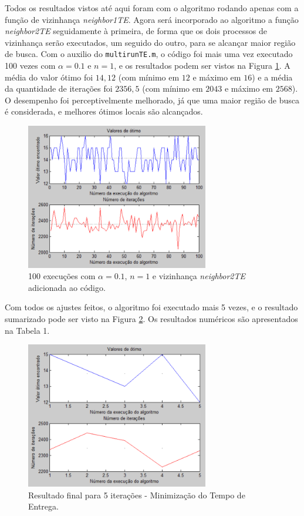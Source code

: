 \documentclass[conference]{IEEEtran}
\begin{document}
Todos os resultados vistos até aqui foram com o algoritmo rodando apenas com a função de vizinhança \textit{neighbor1TE}. Agora será incorporado ao algoritmo a função \textit{neighbor2TE} seguidamente à primeira, de forma que os dois processos de vizinhança serão executados, um seguido do outro, para se alcançar maior região de busca. Com o auxilio do \texttt{multirunTE.m}, o código foi mais uma vez executado 100 vezes com $\alpha = 0.1$ e $n = 1$, e os resultados podem ser vistos na Figura \ref{fig:mult-result-6}. A média do valor ótimo foi $14,12$ (com mínimo em $12$ e máximo em $16$) e a média da quantidade de iterações foi $2356,5$ (com mínimo em $2043$ e máximo em $2568$). O desempenho foi perceptivelmente melhorado, já que uma maior região de busca é considerada, e melhores ótimos locais são alcançados.

	\begin{figure}[h]
		\centering
		\includegraphics[width=8cm]{img/mult-result-6.png}
		\caption{100 execuções com $\alpha = 0.1$, $n = 1$ e vizinhança \textit{neighbor2TE} adicionada ao código.}
		\label{fig:mult-result-6}
	\end{figure}
	
Com todos os ajustes feitos, o algoritmo foi executado mais 5 vezes, e o resultado sumarizado pode ser visto na Figura \ref{fig:mult-result-7}. Os resultados numéricos são apresentados na Tabela 1.

	\begin{figure}[h]
		\centering
		\includegraphics[width=8cm]{img/mult-result-7.png}
		\caption{Resultado final para 5 iterações - Minimização do Tempo de Entrega.}
		\label{fig:mult-result-7}
	\end{figure}
	
\end{document}
